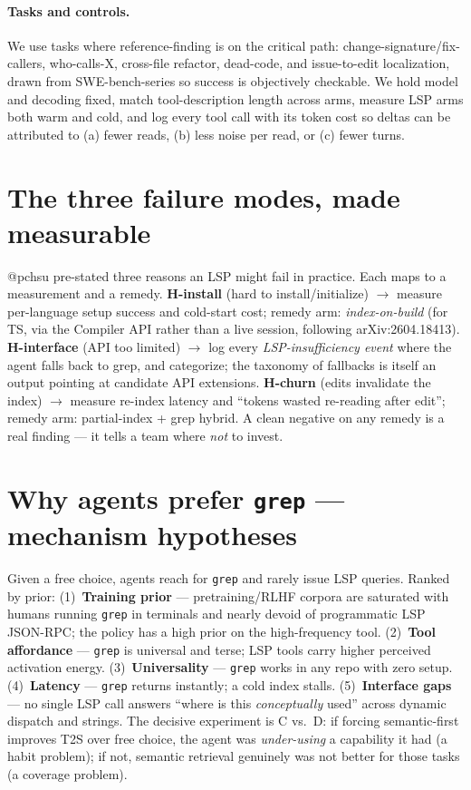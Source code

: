 \documentclass[11pt]{article}
\newcommand{\code}[1]{\texttt{#1}}
\begin{document}
\paragraph{Tasks and controls.} We use tasks where reference-finding is on the critical path:
change-signature/fix-callers, who-calls-X, cross-file refactor, dead-code, and issue-to-edit
localization, drawn from SWE-bench-series so success is objectively checkable. We hold model and decoding
fixed, match tool-description length across arms, measure LSP arms both warm and cold, and log every
tool call with its token cost so deltas can be attributed to (a) fewer reads, (b) less noise per read,
or (c) fewer turns.

\section{The three failure modes, made measurable}

@pchsu pre-stated three reasons an LSP might fail in practice. Each maps to a measurement and a remedy.
\textbf{H-install} (hard to install/initialize) $\rightarrow$ measure per-language setup success and
cold-start cost; remedy arm: \emph{index-on-build} (for TS, via the Compiler API rather than a live
session, following arXiv:2604.18413). \textbf{H-interface} (API too limited) $\rightarrow$ log every
\emph{LSP-insufficiency event} where the agent falls back to grep, and categorize; the taxonomy of
fallbacks is itself an output pointing at candidate API extensions. \textbf{H-churn} (edits invalidate
the index) $\rightarrow$ measure re-index latency and ``tokens wasted re-reading after edit''; remedy
arm: partial-index + grep hybrid. A clean negative on any remedy is a real finding --- it tells a team
where \emph{not} to invest.

\section{Why agents prefer \code{grep} --- mechanism hypotheses}

Given a free choice, agents reach for \code{grep} and rarely issue LSP queries. Ranked by prior:
(1)~\textbf{Training prior} --- pretraining/RLHF corpora are saturated with humans running \code{grep} in
terminals and nearly devoid of programmatic LSP JSON-RPC; the policy has a high prior on the
high-frequency tool. (2)~\textbf{Tool affordance} --- \code{grep} is universal and terse; LSP tools
carry higher perceived activation energy. (3)~\textbf{Universality} --- \code{grep} works in any repo
with zero setup. (4)~\textbf{Latency} --- \code{grep} returns instantly; a cold index stalls.
(5)~\textbf{Interface gaps} --- no single LSP call answers ``where is this \emph{conceptually} used''
across dynamic dispatch and strings. The decisive experiment is C vs.\ D: if forcing semantic-first
improves T2S over free choice, the agent was \emph{under-using} a capability it had (a habit problem);
if not, semantic retrieval genuinely was not better for those tasks (a coverage problem).
\end{document}
